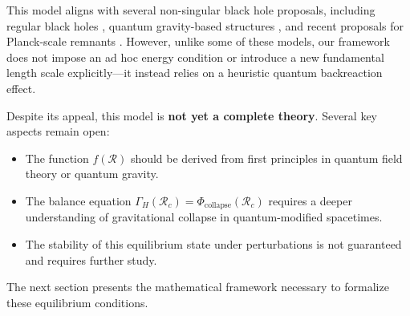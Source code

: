 This model aligns with several non-singular black hole proposals, including regular black holes \cite{bardeen1968non, hayward2006formation}, quantum gravity-based structures \cite{bojowald2005nonsingular, rovelli1996black}, and recent proposals for Planck-scale remnants \cite{brustein2018black}. However, unlike some of these models, our framework does not impose an ad hoc energy condition or introduce a new fundamental length scale explicitly—it instead relies on a heuristic quantum backreaction effect.

Despite its appeal, this model is \textbf{not yet a complete theory}. Several key aspects remain open:
\begin{itemize}
    \item The function \( f(\mathcal{R}) \) should be derived from first principles in quantum field theory or quantum gravity.
    \item The balance equation \( \Gamma_H(\mathcal{R}_c) = \Phi_{\text{collapse}}(\mathcal{R}_c) \) requires a deeper understanding of gravitational collapse in quantum-modified spacetimes.
    \item The stability of this equilibrium state under perturbations is not guaranteed and requires further study.
\end{itemize}

The next section presents the mathematical framework necessary to formalize these equilibrium conditions.
